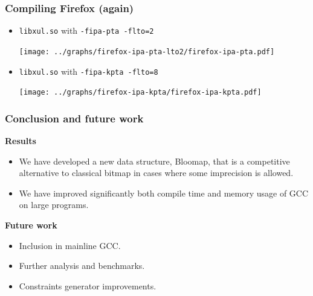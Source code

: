 \documentclass{beamer}
\begin{document}
\begin{frame}[t]
\frametitle{Compiling Firefox (again)}
\begin{itemize}
	\item {{\tt libxul.so} with {\tt -fipa-pta -flto=2}}

		\hspace{1.5cm}\texttt{[image: ../graphs/firefox-ipa-pta-lto2/firefox-ipa-pta.pdf]}

	\item {{\tt libxul.so} with {\tt -fipa-kpta -flto=8}}

		\hspace{1.5cm}\texttt{[image: ../graphs/firefox-ipa-kpta/firefox-ipa-kpta.pdf]}
\end{itemize}
\end{frame}

\begin{frame}[t]
\frametitle{Conclusion and future work}
\textbf{Results}\\
	\begin{itemize}
		\item We have developed a new data structure, Bloomap, that is a competitive alternative to
			classical bitmap in cases where 
			some imprecision is allowed.
		\item We have improved significantly both compile time and memory usage
			of GCC on large programs.
	\end{itemize}

\vfill
		\pause

\textbf{Future work} \\
	\begin{itemize}
		\item Inclusion in mainline GCC.
		\item Further analysis and benchmarks.
		\item Constraints generator improvements.
	\end{itemize}
\end{frame}
\end{document}
